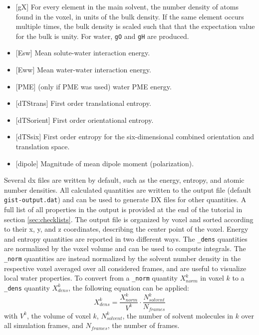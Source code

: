 \documentclass[9pt,tutorial]{livecoms}
\newcommand{\code}{\texttt}
\newcommand\inlinecode{\texttt}
\begin{document}
\begin{itemize}
	\item{[gX] For every element in the main solvent, the number density of atoms found in the voxel, in units of the bulk density. If the same element occurs multiple times, the bulk density is scaled such that that the expectation value for the bulk is unity. For water, \code{gO} and \code{gH} are produced.}
	\item{[Esw] Mean solute-water interaction energy.}
	\item{[Eww] Mean water-water interaction energy.}
	\item{[PME] (only if PME was used) water PME energy.}
	\item{[dTStrans] First order translational entropy.}
	\item{[dTSorient] First order orientational entropy.}
	\item{[dTSsix] First order entropy for the six-dimensional combined orientation and translation space.}
	\item{[dipole] Magnitude of mean dipole moment (polarization).}
\end{itemize}

Several dx files are written by default, such as the energy, entropy, and atomic number densities.
All calculated quantities are written to the output file (default \inlinecode{gist-output.dat}) and can be used to generate DX files for other quantities.
A full list of all properties in the output is provided at the end of the tutorial in section \ref{sec:checklists}. 
The output file is organized by voxel and sorted according to their x, y, and z coordinates, describing the center point of the voxel.
Energy and entropy quantities are reported in two different ways.
The \inlinecode{\_dens} quantities are normalized by the voxel volume and can be used to compute integrals.
The \inlinecode{\_norm} quantities are instead normalized by the solvent number density in the respective voxel averaged over all considered frames, and are useful to visualize local water properties.
To convert from a \inlinecode{\_norm} quantity $X^k_{norm}$ in voxel $k$ to a \inlinecode{\_dens} quantity $X^k_{dens}$, the following equation can be applied:
\begin{equation}
	X^k_{dens} = \frac{X^k_{norm}}{V^k} \cdot \frac{N^k_{solvent}}{N_{frames}}
\end{equation}
with $V^k$, the volume of voxel $k$, $N^k_{solvent}$, the number of solvent molecules in $k$ over all simulation frames, and $N_{frames}$, the number of frames.
\end{document}
